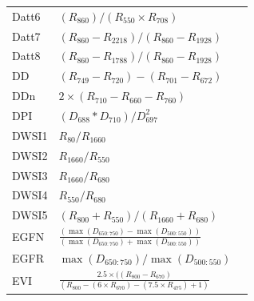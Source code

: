 \documentclass[letterpaper, peerreview, draftcls]{IEEEtran}
\begin{document}
\begin{xtabular*}{0.3\textwidth}{lll}
	Datt6           & $(R_{860})/(R_{550}\times R_{708})$                                                                 & \cite{datt1998}                \\
	Datt7           & $(R_{860} - R_{2218})/(R_{860} - R_{1928})$                                                         & \cite{datt1999a}               \\
	Datt8           & $(R_{860} - R_{1788})/(R_{860} - R_{1928})$                                                         & \cite{datt1999a}               \\
	DD              & $(R_{749}-R_{720})-(R_{701}-R_{672})$                                                               & \cite{maire2004}     \\
	DDn             & $2\times (R_{710}-R_{660}-R_{760})$                                                                 & \cite{lemaire2008}     \\
	DPI             & $(D_{688}*D_{710})/D_{697}^2$                                                                       & \cite{zarco-tejada2003a} \\
	DWSI1           & $R_{80}/R_{1660}$                                                                                   & \cite{apan2004}         \\
	DWSI2           & $R_{1660}/R_{550}$                                                                                  & \cite{apan2004}         \\
	DWSI3           & $R_{1660}/R_{680}$                                                                                  & \cite{apan2004}         \\
	DWSI4           & $R_{550}/R_{680}$                                                                                   & \cite{apan2004}         \\
	DWSI5           & $(R_{800} + R_{550})/(R_{1660} + R_{680})$                                                          & \cite{apan2004}         \\
	EGFN            & $\frac{(\max(D_{650:750})-\max(D_{500:550}))}{(\max(D_{650:750})+\max(D_{500:550}))}$               & \cite{penuelas1994}     \\
	EGFR            & $\max(D_{650:750})/\max(D_{500:550})$                                                               & \cite{penuelas1994}     \\
	EVI             & $\frac{2.5\times ((R_{800}-R_{670}) }{ (R_{800}-(6\times R_{670})-(7.5\times R_{475})+1)}$          & \cite{huete1997a}        \\

\end{xtabular*}
\end{document}
